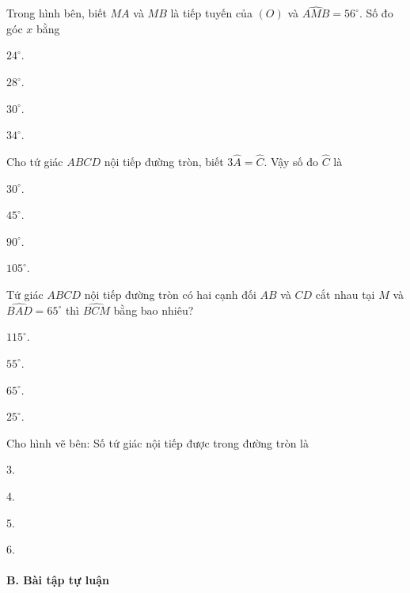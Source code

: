 \documentclass[%
    fontsize=12pt,%
    chapterprefix=false,%
    open=right,%
    twoside=false,%
    numbers=noenddot,%
    headings=optiontohead,%
    final,%
    DIV=15,%
    parskip=half %
]{scrbook}
\begin{document}
\begin{tracnghiem}
\item Trong hình bên, biết $MA$ và $MB$ là tiếp tuyến của $(O)$ và $\widehat{AMB} = 56^\circ$. Số đo góc $x$ bằng
\begin{options}
  \item $24^\circ$.
  \item $28^\circ$.
  \item $30^\circ$.
  \item $34^\circ$.
\end{options}

\item Cho tứ giác $ABCD$ nội tiếp đường tròn, biết $3\widehat{A} = \widehat{C}$. Vậy số đo $\widehat{C}$ là
\begin{options}
  \item $30^\circ$.
  \item $45^\circ$.
  \item $90^\circ$.
  \item $105^\circ$.
\end{options}

\item Tứ giác $ABCD$ nội tiếp đường tròn có hai cạnh đối $AB$ và $CD$ cắt nhau tại $M$ và $\widehat{BAD} = 65^\circ$ thì $\widehat{BCM}$ bằng bao nhiêu?
\begin{options}
  \item $115^\circ$.
  \item $55^\circ$.
  \item $65^\circ$.
  \item $25^\circ$.
\end{options}

\item Cho hình vẽ bên: Số tứ giác nội tiếp được trong đường tròn là
\begin{options}
  \item 3.
  \item 4.
  \item 5.
  \item 6.
\end{options}

\end{tracnghiem}

\paragraph{B. Bài tập tự luận}
\end{document}
